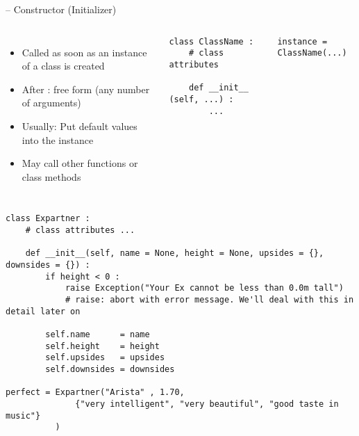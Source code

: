 
\begin{frame}[fragile]{ -- Constructor (Initializer)}
%
\vspace{-10pt}
\begin{columns}[t]
\begin{itemize}
\item Called as soon as an instance of a class is created
\item After : free form (any number of arguments)
\item Usually: Put default values into the instance
\item May call other functions or class methods
\end{itemize}
%
\begin{codebox}
\begin{verbatim}
class ClassName :
    # class attributes
    
    def __init__ (self, ...) :
        ...
\end{verbatim}
\end{codebox}
%
\begin{codebox}
\begin{verbatim}
instance = ClassName(...)
\end{verbatim}
\end{codebox}
\end{columns}
%
\end{frame}


\begin{frame}[fragile]
%
\begin{codebox}
\begin{verbatim}
class Expartner :
    # class attributes ...
    
    def __init__(self, name = None, height = None, upsides = {}, downsides = {}) :
        if height < 0 :
            raise Exception("Your Ex cannot be less than 0.0m tall")
            # raise: abort with error message. We'll deal with this in detail later on
        
        self.name      = name
        self.height    = height
        self.upsides   = upsides
        self.downsides = downsides
    
perfect = Expartner("Arista" , 1.70, 
              {"very intelligent", "very beautiful", "good taste in music"}
          )
\end{verbatim}
\end{codebox}
%
\end{frame}


